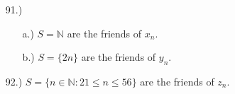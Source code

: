 \documentclass[12pt]{article}
\begin{document}
\begin{itemize}
\begin{itemize}
    \end{itemize}









    \item [91.)] \begin{itemize}
        \item [a.)] $S=\mathbb{N}$ are the friends of $x_n$.

    \item [b.)] $S=\{2n\}$ are the friends of $y_n$.
    \end{itemize}

    \item [92.)] $S=\{n\in\mathbb{N}:21\leq n\leq56\}$ are the friends of $z_n$.







\end{itemize}
\end{document}
